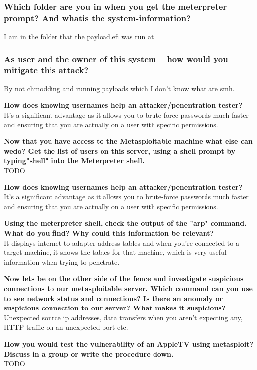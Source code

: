 \subsubsection*{Which folder are you in when you get the meterpreter prompt? And whatis the system-information?}
I am in the folder that the payload.efi was run at

\subsubsection*{As user and the owner of this system -- how would you mitigate this attack?}
By not chmodding and running payloads which I don't know what are smh.

\textbf{How does knowing usernames help an attacker/penentration tester?
}\\
It's a significant advantage as it allows you to brute-force passwords much faster and ensuring that you are actually on a user with specific permissions.

\textbf{Now that you have access to the Metasploitable machine what else can wedo? Get the list of users on this server, using a shell prompt by typing"shell" into the Meterpreter shell.}\\
TODO

\textbf{\dag How does knowing usernames help an attacker/penentration tester?}\\
It's a significant advantage as it allows you to brute-force passwords much faster and ensuring that you are actually on a user with specific permissions.

\textbf{\dag Using the meterpreter shell, check the output of the "arp" command. What do you find? Why could this information be relevant?
}\\
It displays internet-to-adapter address tables and when you're connected to a target machine, it shows the tables for that machine, which is very useful information when trying to penetrate.

\textbf{\dag Now lets be on the other side of the fence and investigate suspicious connections to our metasploitable server. Which command can you use to see network status and connections? Is there an anomaly or suspicious connection to our server? What makes it suspicious?}\\
Unexpected source ip addresses, data transfers when you aren't expecting any, HTTP traffic on an unexpected port etc.

\textbf{How you would test the vulnerability of an AppleTV using metasploit?Discuss in a group or write the procedure down.}\\
TODO